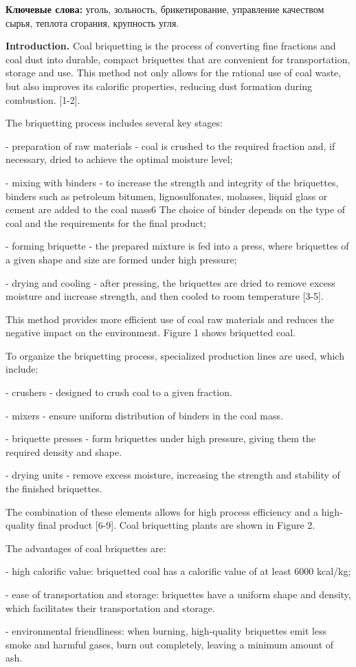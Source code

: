 {\bfseries Ключевые слова:} уголь, зольность, брикетирование, управление
качеством сырья, теплота сгорания, крупность угля.

\begin{multicols}{2}
{\bfseries Introduction.} Coal briquetting is the process of converting
fine fractions and coal dust into durable, compact briquettes that are
convenient for transportation, storage and use. This method not only
allows for the rational use of coal waste, but also improves its
calorific properties, reducing dust formation during combustion.
{[}1-2{]}.

The briquetting process includes several key stages:

- preparation of raw materials - coal is crushed to the required
fraction and, if necessary, dried to achieve the optimal moisture level;

- mixing with binders - to increase the strength and integrity of the
briquettes, binders such as petroleum bitumen, lignosulfonates,
molasses, liquid glass or cement are added to the coal mass6 The choice
of binder depends on the type of coal and the requirements for the final
product;

- forming briquette - the prepared mixture is fed into a press, where
briquettes of a given shape and size are formed under high pressure;

- drying and cooling - after pressing, the briquettes are dried to
remove excess moisture and increase strength, and then cooled to room
temperature {[}3-5{]}.

This method provides more efficient use of coal raw materials and
reduces the negative impact on the environment. Figure 1 shows
briquetted coal.

To organize the briquetting process, specialized production lines are
used, which include:

- crushers - designed to crush coal to a given fraction.

- mixers - ensure uniform distribution of binders in the coal mass.

- briquette presses - form briquettes under high pressure, giving them
the required density and shape.

- drying units - remove excess moisture, increasing the strength and
stability of the finished briquettes.

The combination of these elements allows for high process efficiency and
a high-quality final product {[}6-9{]}. Coal briquetting plants are
shown in Figure 2.

The advantages of coal briquettes are:

- high calorific value: briquetted coal has a calorific value of at
least 6000 kcal/kg;

- ease of transportation and storage: briquettes have a uniform shape
and density, which facilitates their transportation and storage.

- environmental friendliness: when burning, high-quality briquettes emit
less smoke and harmful gases, burn out completely, leaving a minimum amount of ash.
\end{multicols}

